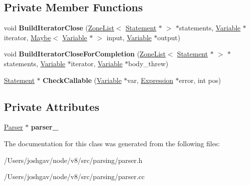 \subsection*{Private Member Functions}
\begin{DoxyCompactItemize}
\item 
void {\bfseries Build\+Iterator\+Close} (\hyperlink{classv8_1_1internal_1_1_zone_list}{Zone\+List}$<$ \hyperlink{classv8_1_1internal_1_1_statement}{Statement} $\ast$ $>$ $\ast$statements, \hyperlink{classv8_1_1internal_1_1_variable}{Variable} $\ast$iterator, \hyperlink{classv8_1_1_maybe}{Maybe}$<$ \hyperlink{classv8_1_1internal_1_1_variable}{Variable} $\ast$ $>$ input, \hyperlink{classv8_1_1internal_1_1_variable}{Variable} $\ast$output)\hypertarget{classv8_1_1internal_1_1_parser_traits_a23edb7ce0fff0afa3dea22b91008acdc}{}\label{classv8_1_1internal_1_1_parser_traits_a23edb7ce0fff0afa3dea22b91008acdc}

\item 
void {\bfseries Build\+Iterator\+Close\+For\+Completion} (\hyperlink{classv8_1_1internal_1_1_zone_list}{Zone\+List}$<$ \hyperlink{classv8_1_1internal_1_1_statement}{Statement} $\ast$ $>$ $\ast$statements, \hyperlink{classv8_1_1internal_1_1_variable}{Variable} $\ast$iterator, \hyperlink{classv8_1_1internal_1_1_variable}{Variable} $\ast$body\+\_\+threw)\hypertarget{classv8_1_1internal_1_1_parser_traits_ad62360c7f60d29e55876a7294395dedb}{}\label{classv8_1_1internal_1_1_parser_traits_ad62360c7f60d29e55876a7294395dedb}

\item 
\hyperlink{classv8_1_1internal_1_1_statement}{Statement} $\ast$ {\bfseries Check\+Callable} (\hyperlink{classv8_1_1internal_1_1_variable}{Variable} $\ast$var, \hyperlink{classv8_1_1internal_1_1_expression}{Expression} $\ast$error, int pos)\hypertarget{classv8_1_1internal_1_1_parser_traits_a02ab678c453b5b98f74dfd567d5947c9}{}\label{classv8_1_1internal_1_1_parser_traits_a02ab678c453b5b98f74dfd567d5947c9}

\end{DoxyCompactItemize}
\subsection*{Private Attributes}
\begin{DoxyCompactItemize}
\item 
\hyperlink{classv8_1_1internal_1_1_parser}{Parser} $\ast$ {\bfseries parser\+\_\+}\hypertarget{classv8_1_1internal_1_1_parser_traits_a927ccce9871593acc94f8bbdc7310803}{}\label{classv8_1_1internal_1_1_parser_traits_a927ccce9871593acc94f8bbdc7310803}

\end{DoxyCompactItemize}


The documentation for this class was generated from the following files\+:\begin{DoxyCompactItemize}
\item 
/\+Users/joshgav/node/v8/src/parsing/parser.\+h\item 
/\+Users/joshgav/node/v8/src/parsing/parser.\+cc\end{DoxyCompactItemize}

